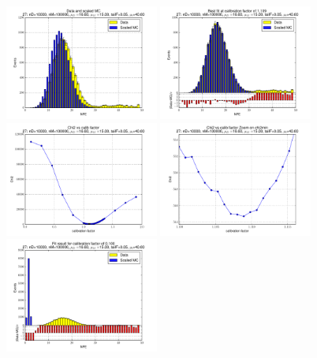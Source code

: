 
 \begin{figure}[htbp] \begin{center} 
\includegraphics[width=0.45\textwidth]{../FIGURES/27/FIG_Data_and_scaled_MC.pdf} 
\includegraphics[width=0.45\textwidth]{../FIGURES/27/FIG_Best_fit_at_calibration_factor_of_1_109.pdf} 
\includegraphics[width=0.45\textwidth]{../FIGURES/27/FIG_Chi2_vs_calib_factor.pdf} 
\includegraphics[width=0.45\textwidth]{../FIGURES/27/FIG_Chi2_vs_calib_factor_Zoom_on_chi2min.pdf} 
\includegraphics[width=0.45\textwidth]{../FIGURES/27/FIG_Fit_result_for_calibration_factor_of_0_100.pdf} 

\end{center}
\end{figure}
